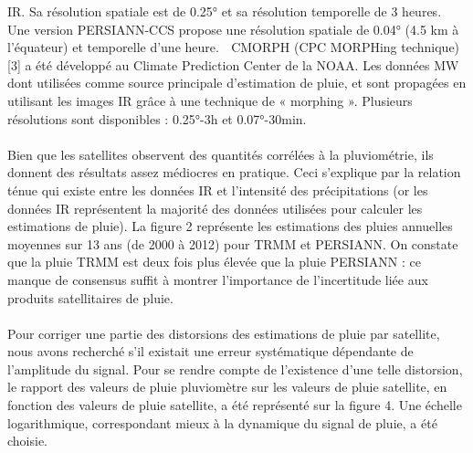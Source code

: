 IR. Sa résolution spatiale est de 0.25° et sa résolution temporelle de 3 heures. Une
version PERSIANN-CCS propose une résolution spatiale de 0.04° (4.5 km à
l'équateur) et temporelle d'une heure.
 CMORPH (CPC MORPHing technique) [3] a été développé au Climate Prediction
Center de la NOAA. Les données MW dont utilisées comme source principale d'estimation de pluie, et sont propagées en utilisant les images IR grâce à une
technique de « morphing ». Plusieurs résolutions sont disponibles : 0.25°-3h et
0.07°-30min.\\ \ \\
Bien que les satellites observent des quantités corrélées à la pluviométrie, ils donnent des
résultats assez médiocres en pratique. Ceci s'explique par la relation ténue qui existe
entre les données IR et l'intensité des précipitations (or les données IR représentent la
majorité des données utilisées pour calculer les estimations de pluie). La figure 2
représente les estimations des pluies annuelles moyennes sur 13 ans (de 2000 à 2012)
pour TRMM et PERSIANN. On constate que la pluie TRMM est deux fois plus élevée que
la pluie PERSIANN : ce manque de consensus suffit à montrer l'importance de l'incertitude
liée aux produits satellitaires de pluie.
\\ \ \\
Pour corriger une partie des distorsions des estimations de pluie par satellite, nous avons
recherché s'il existait une erreur systématique dépendante de l'amplitude du signal. Pour
se rendre compte de l'existence d'une telle distorsion, le rapport des valeurs de pluie
pluviomètre sur les valeurs de pluie satellite, en fonction des valeurs de pluie satellite, a
été représenté sur la figure 4. Une échelle logarithmique, correspondant mieux à la
dynamique du signal de pluie, a été choisie. \cite{brochart_correction_2014}
